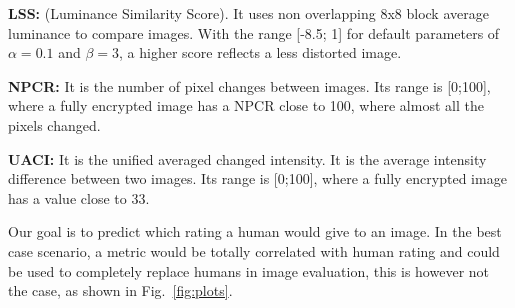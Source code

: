 \documentclass{article}
\begin{document}
\textbf{LSS\cite{mao2004security}:} (Luminance Similarity Score). It uses non overlapping 8x8 block average luminance to compare images. With the range [-8.5; 1] for default parameters of $\alpha=0.1$ and $\beta=3$, a higher score reflects a less distorted image.

\textbf{NPCR\cite{chen2004symmetric, mao2004novel}:} It is the number of pixel changes between images. Its range is [0;100], where a fully encrypted image has a NPCR close to 100, where almost all the pixels changed.

\textbf{UACI\cite{chen2004symmetric, mao2004novel}:} It is the unified averaged changed intensity. It is the average intensity difference between two images. Its range is [0;100], where a fully encrypted image has a value close to 33.




Our goal is to predict which rating a human would give to an image. In the best case scenario, a metric would be totally correlated with human rating and could be used to completely replace humans in image evaluation, this is however not the case, as shown in Fig.~\ref{fig:plots}.
\end{document}
